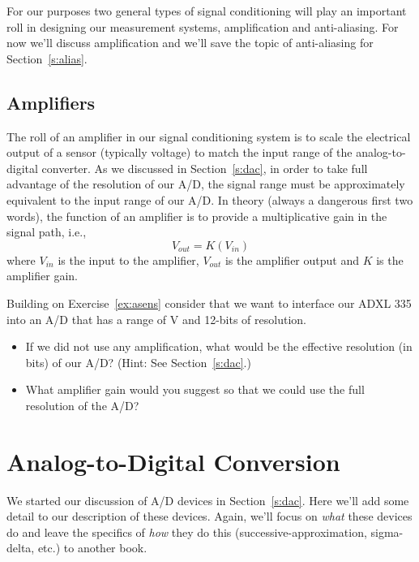 For our purposes two general types of signal conditioning will play an important roll in designing our measurement systems, amplification and anti-aliasing.  For now we'll discuss amplification and we'll save the topic of anti-aliasing for Section~\ref{s:alias}.

\subsection{Amplifiers}
The roll of an amplifier in our signal conditioning system is to scale the electrical output of a sensor (typically voltage) to match the input range of the analog-to-digital converter.  As we discussed in Section~\ref{s:dac}, in order to take full advantage of the resolution of our A/D, the signal range must be approximately equivalent to the input range of our A/D.  In theory (always a dangerous first two words), the function of an amplifier is to provide a multiplicative gain in the signal path, i.e., 
\[
V_{out} = K\left(V_{in}\right)
\]
where $V_{in}$ is the input to the amplifier, $V_{out}$ is the amplifier output and $K$ is the amplifier gain. 

\begin{ex}
Building on Exercise~\ref{ex:asens} consider that we want to interface our ADXL 335 into an A/D that has a range of \unit[0--10]{V} and 12-bits of resolution.  
\begin{itemize}
\item If we did not use any amplification, what would be the effective resolution (in bits) of our A/D?  (Hint: See Section~\ref{s:dac}.)
\item What amplifier gain would you suggest so that we could use the full resolution of the A/D?
\end{itemize}
\end{ex}

\section{Analog-to-Digital Conversion}
We started our discussion of A/D devices in Section~\ref{s:dac}.  Here we'll add some detail to our description of these devices.  Again, we'll focus on \emph{what} these devices do and leave the specifics of \emph{how} they do this (successive-approximation, sigma-delta, etc.) to another book.
